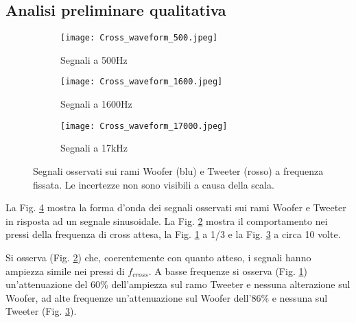 \documentclass[../Relazione_circuiti]{subfiles}
\begin{document}
\subsection{Analisi preliminare qualitativa}

  \begin{figure}[H]
    \centering

    \begin{subfigure}[b]{0.3\textwidth}
      \centering
      \texttt{[image: Cross\_waveform\_500.jpeg]}

      \caption{Segnali a 500Hz}
      \label{fig:signal_500}

    \end{subfigure}
    \hfill
    \begin{subfigure}[b]{0.3\textwidth}
      \centering
      \texttt{[image: Cross\_waveform\_1600.jpeg]}

      \caption{Segnali a 1600Hz}
      \label{fig:signal_1600}

    \end{subfigure}
    \hfill
    \begin{subfigure}[b]{0.3\textwidth}
      \centering
      \texttt{[image: Cross\_waveform\_17000.jpeg]}

      \caption{Segnali a 17kHz}
      \label{fig:signal_17k}

    \end{subfigure}

    \caption{Segnali osservati sui rami Woofer (blu) e Tweeter (rosso)
      a frequenza fissata. Le incertezze non sono visibili a causa della scala.}
    \label{fig:signal_waveforms}

  \end{figure}

  La Fig. \ref{fig:signal_waveforms} mostra la forma d'onda dei segnali osservati sui rami Woofer e Tweeter in risposta
  ad un segnale sinusoidale.
  La Fig. \ref{fig:signal_1600} mostra il comportamento nei pressi della frequenza di cross attesa, la Fig.
  \ref{fig:signal_500} a 1/3 e la Fig. \ref{fig:signal_17k} a circa 10 volte.

  Si osserva (Fig. \ref{fig:signal_1600}) che, coerentemente con quanto atteso, i segnali hanno ampiezza simile nei
  pressi di $f_{cross}$.
  A basse frequenze si osserva (Fig. \ref{fig:signal_500}) un'attenuazione del 60\% dell'ampiezza sul ramo Tweeter e
  nessuna alterazione sul Woofer, ad alte frequenze un'attenuazione sul Woofer dell'86\% e nessuna sul Tweeter (Fig.
  \ref{fig:signal_17k}).
\end{document}
